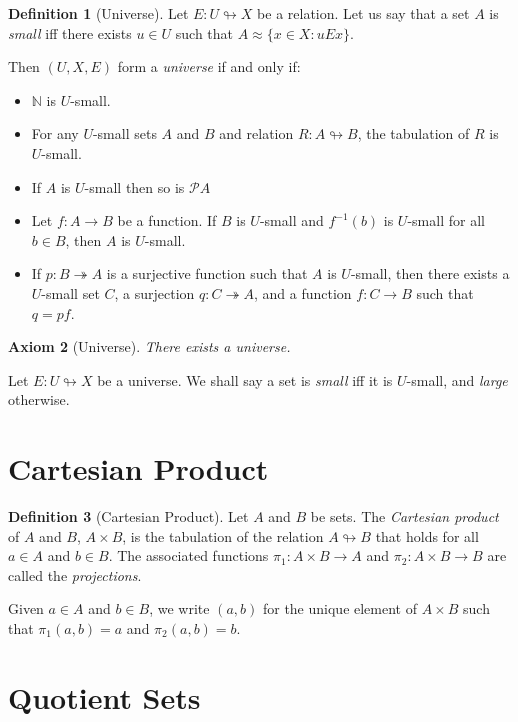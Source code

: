 \documentclass{book}
\newtheorem{ax}{Axiom}[chapter]
\theoremstyle{definition}
\newtheorem{df}[ax]{Definition}
\begin{document}
\begin{df}[Universe]
Let $E : U \looparrowright X$ be a relation. Let us say that a set $A$ is \emph{small} iff there exists $u \in U$ such that $A \approx \{ x \in X : uEx \}$.

Then $(U,X,E)$ form a \emph{universe} if and only if:
\begin{itemize}
\item $\mathbb{N}$ is $U$-small.
\item For any $U$-small sets $A$ and $B$ and relation $R : A \looparrowright B$, the tabulation of $R$ is $U$-small.
\item If $A$ is $U$-small then so is $\mathcal{P} A$
\item Let $f : A \rightarrow B$ be a function. If $B$ is $U$-small and $f^{-1}(b)$ is $U$-small for all $b \in B$, then $A$ is $U$-small.
\item If $p : B \twoheadrightarrow A$ is a surjective function such that $A$ is $U$-small, then there exists a $U$-small set $C$, a surjection $q : C \twoheadrightarrow A$, and a function $f : C \rightarrow B$ such that $q = pf$.
\end{itemize}
\end{df}

\begin{ax}[Universe]
There exists a universe.
\end{ax}

Let $E : U \looparrowright X$ be a universe. We shall say a set is \emph{small} iff it is $U$-small, and \emph{large} otherwise.

\section{Cartesian Product}

\begin{df}[Cartesian Product]
Let $A$ and $B$ be sets. The \emph{Cartesian product} of $A$ and $B$, $A \times B$, is the tabulation of the relation $A \looparrowright B$ that holds for all $a \in A$ and $b \in B$. The associated functions $\pi_1 : A \times B \rightarrow A$ and $\pi_2 : A \times B \rightarrow B$ are called the \emph{projections}.

Given $a \in A$ and $b \in B$, we write $(a,b)$ for the unique element of $A \times B$ such that $\pi_1(a,b) = a$ and $\pi_2(a,b) = b$.
\end{df}

\section{Quotient Sets}
\end{document}
